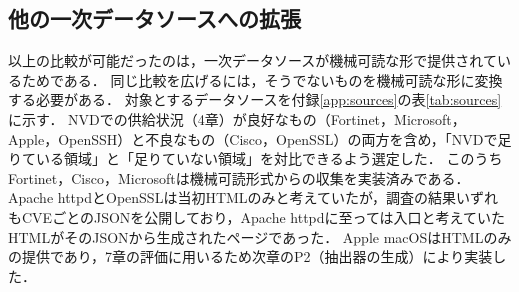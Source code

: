 \subsection{他の一次データソースへの拡張}

以上の比較が可能だったのは，一次データソースが機械可読な形で提供されているためである．
同じ比較を広げるには，そうでないものを機械可読な形に変換する必要がある．
対象とするデータソースを付録\ref{app:sources}の表\ref{tab:sources}に示す．
NVDでの供給状況（4章）が良好なもの（Fortinet，Microsoft，Apple，OpenSSH）と不良なもの（Cisco，OpenSSL）の両方を含め，「NVDで足りている領域」と「足りていない領域」を対比できるよう選定した．
このうちFortinet，Cisco，Microsoftは機械可読形式からの収集を実装済みである\cite{vuls-data-update}．
Apache httpdとOpenSSLは当初HTMLのみと考えていたが，調査の結果いずれもCVEごとのJSONを公開しており\cite{vdu-pr907,vdu-pr900}，Apache httpdに至っては入口と考えていたHTMLがそのJSONから生成されたページであった．
Apple macOSはHTMLのみの提供であり，7章の評価に用いるため次章のP2（抽出器の生成）により実装した．
